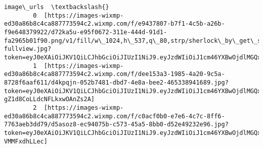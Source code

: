 \documentclass[11pt]{article}
\begin{document}
\begin{Verbatim}[commandchars=\\\{\}]
                                                                                                                                                                                                                                                                                                                                                                                                                                                                                                                                                                                                                                                                                                                                                     image\_urls  \textbackslash{}
        0  [https://images-wixmp-ed30a86b8c4ca887773594c2.wixmp.com/f/e9437807-b7f1-4c5b-a26b-f9e648379922/d72ka5u-e95f0672-311e-444d-91d1-fa2965b01f90.png/v1/fill/w\_1024,h\_537,q\_80,strp/sherlock\_by\_get\_sherlock\_d72ka5u-fullview.jpg?token=eyJ0eXAiOiJKV1QiLCJhbGciOiJIUzI1NiJ9.eyJzdWIiOiJ1cm46YXBwOjdlMGQxODg5ODIyNjQzNzNhNWYwZDQxNWVhMGQyNmUwIiwiaXNzIjoidXJuOmFwcDo3ZTBkMTg4OTgyMjY0MzczYTVmMGQ0MTVlYTBkMjZlMCIsIm9iaiI6W1t7ImhlaWdodCI6Ijw9NTM3IiwicGF0aCI6IlwvZlwvZTk0Mzc4MDctYjdmMS00YzViLWEyNmItZjllNjQ4Mzc5OTIyXC9kNzJrYTV1LWU5NWYwNjcyLTMxMWUtNDQ0ZC05MWQxLWZhMjk2NWIwMWY5MC5wbmciLCJ3aWR0aCI6Ijw9MTAyNCJ9XV0sImF1ZCI6WyJ1cm46c2VydmljZTppbWFnZS5vcGVyYXRpb25zIl19.y4LtbGzQLxiWRZVSYC3OuJMVbv6XfvgSIGkGIzv47XU]                                     
        1  [https://images-wixmp-ed30a86b8c4ca887773594c2.wixmp.com/f/dee153a3-1985-4a20-9c5a-8728f6aaf611/d4kpqjn-052b7481-dbd7-4e8a-bee2-465338941689.jpg?token=eyJ0eXAiOiJKV1QiLCJhbGciOiJIUzI1NiJ9.eyJzdWIiOiJ1cm46YXBwOjdlMGQxODg5ODIyNjQzNzNhNWYwZDQxNWVhMGQyNmUwIiwiaXNzIjoidXJuOmFwcDo3ZTBkMTg4OTgyMjY0MzczYTVmMGQ0MTVlYTBkMjZlMCIsIm9iaiI6W1t7InBhdGgiOiJcL2ZcL2RlZTE1M2EzLTE5ODUtNGEyMC05YzVhLTg3MjhmNmFhZjYxMVwvZDRrcHFqbi0wNTJiNzQ4MS1kYmQ3LTRlOGEtYmVlMi00NjUzMzg5NDE2ODkuanBnIn1dXSwiYXVkIjpbInVybjpzZXJ2aWNlOmZpbGUuZG93bmxvYWQiXX0.MGdgMPuuE2eZiv6yrT-gZ1d8CoLLdcNFLkxwOAnZs2A]                                                                                                                                                                   
        2  [https://images-wixmp-ed30a86b8c4ca887773594c2.wixmp.com/f/c0acf0b0-e7e6-4c7c-8ff6-7763aeb3dd79/d5asoz8-ec94075b-c573-45a5-8bb0-d52e49232e96.jpg?token=eyJ0eXAiOiJKV1QiLCJhbGciOiJIUzI1NiJ9.eyJzdWIiOiJ1cm46YXBwOjdlMGQxODg5ODIyNjQzNzNhNWYwZDQxNWVhMGQyNmUwIiwiaXNzIjoidXJuOmFwcDo3ZTBkMTg4OTgyMjY0MzczYTVmMGQ0MTVlYTBkMjZlMCIsIm9iaiI6W1t7InBhdGgiOiJcL2ZcL2MwYWNmMGIwLWU3ZTYtNGM3Yy04ZmY2LTc3NjNhZWIzZGQ3OVwvZDVhc296OC1lYzk0MDc1Yi1jNTczLTQ1YTUtOGJiMC1kNTJlNDkyMzJlOTYuanBnIn1dXSwiYXVkIjpbInVybjpzZXJ2aWNlOmZpbGUuZG93bmxvYWQiXX0.raEwrdO3gYAzPWV0BaonYhXWzcC3pAm-VMMFxdhLLec]                                                                                                                                                                   

\end{Verbatim}
\end{document}
